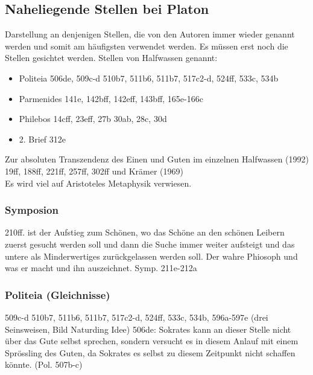 \subsection*{Naheliegende Stellen bei Platon %
}
Darstellung an denjenigen Stellen, die von den Autoren immer wieder genannt werden und somit am häufigsten verwendet werden. Es müssen erst noch die Stellen gesichtet werden. Stellen von Halfwassen genannt:
\begin{itemize}
    \item {Politeia 506de, 509c-d 510b7, 511b6, 511b7, 517c2-d, 524ff, 533c, 534b}
    \item {Parmenides 141e, 142bff, 142eff, 143bff, 165e-166c}
    \item {Philebos 14cff, 23eff, 27b 30ab, 28c, 30d}
    \item {2. Brief 312e}
\end{itemize}

Zur absoluten Transzendenz des Einen und Guten im einzelnen Halfwassen (1992) 19ff, 188ff, 221ff, 257ff, 302ff und Krämer (1969)\\
Es wird viel auf Aristoteles Metaphysik verwiesen.
\subsubsection*{Symposion}
210ff. ist der Aufstieg zum Schönen, wo das Schöne an den schönen Leibern zuerst gesucht werden soll und dann die Suche immer weiter aufsteigt und das untere als Minderwertiges zurückgelassen werden soll.
Der wahre Phiosoph und was er macht und ihn auszeichnet. Symp. 211e-212a

\subsubsection*{Politeia (Gleichnisse)}
509c-d 510b7, 511b6, 511b7, 517c2-d, 524ff, 533c, 534b, 596a-597e (drei Seinsweisen, Bild Naturding Idee)
506de: Sokrates kann an dieser Stelle nicht über das Gute selbst sprechen, sondern versucht es in diesem Anlauf mit einem Sprössling des Guten, da Sokrates es selbst zu diesem Zeitpunkt nicht schaffen könnte.
 (Pol. 507b-c)

